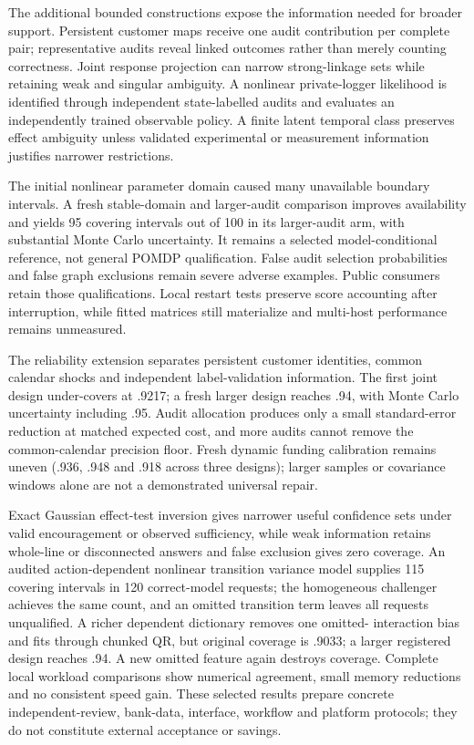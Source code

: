 \documentclass[11pt,a4paper,openany]{book}
\begin{document}
The additional bounded constructions expose the information needed for
broader support. Persistent customer maps receive one audit contribution
per complete pair; representative audits reveal linked outcomes rather
than merely counting correctness. Joint response projection can narrow
strong-linkage sets while retaining weak and singular ambiguity. A nonlinear
private-logger likelihood is identified through independent state-labelled
audits and evaluates an independently trained observable policy. A finite
latent temporal class preserves effect ambiguity unless validated experimental
or measurement information justifies narrower restrictions.

The initial nonlinear parameter domain caused many unavailable boundary
intervals. A fresh stable-domain and larger-audit comparison improves
availability and yields 95 covering intervals out of 100 in its larger-audit
arm, with substantial Monte Carlo uncertainty. It remains a selected
model-conditional reference, not general POMDP qualification. False audit
selection probabilities and false graph exclusions remain severe adverse
examples. Public consumers retain those qualifications. Local restart tests
preserve score accounting after interruption, while fitted matrices still
materialize and multi-host performance remains unmeasured.

The reliability extension separates persistent customer identities, common
calendar shocks and independent label-validation information. The first
joint design under-covers at .9217; a fresh larger design reaches .94, with
Monte Carlo uncertainty including .95. Audit allocation produces only a small
standard-error reduction at matched expected cost, and more audits cannot
remove the common-calendar precision floor. Fresh dynamic funding calibration
remains uneven (.936, .948 and .918 across three designs); larger samples or
covariance windows alone are not a demonstrated universal repair.

Exact Gaussian effect-test inversion gives narrower useful confidence sets
under valid encouragement or observed sufficiency, while weak information
retains whole-line or disconnected answers and false exclusion gives zero
coverage. An audited action-dependent nonlinear transition variance model
supplies 115 covering intervals in 120 correct-model requests; the homogeneous
challenger achieves the same count, and an omitted transition term leaves
all requests unqualified. A richer dependent dictionary removes one omitted-
interaction bias and fits through chunked QR, but original coverage is .9033;
a larger registered design reaches .94. A new omitted feature again destroys
coverage. Complete local workload comparisons show numerical agreement,
small memory reductions and no consistent speed gain. These selected results
prepare concrete independent-review, bank-data, interface, workflow and
platform protocols; they do not constitute external acceptance or savings.
\end{document}
